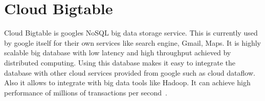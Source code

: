 \section{Cloud Bigtable}

Cloud Bigtable is googles NoSQL big data storage service. This is currently
used by google itself for their own services like search engine, Gmail, Maps.
It is highly scalable big database with low latency and high throughput achieved
by distributed computing. Using this database makes it easy to integrate the
database with other cloud services provided from google such as cloud dataflow.
Also it allows to integrate with big data tools like Hadoop. It can achieve high 
performance of millions of transactions per  
second~\cite{hid-sp18-502-GoogleCloudBigtable}.



